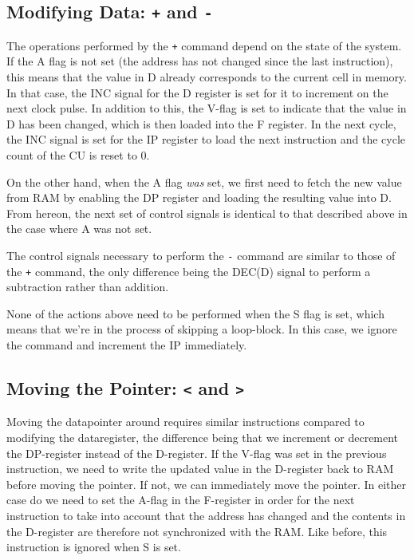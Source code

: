\subsection{Modifying Data: \texttt{+} and \texttt{-}}
The operations performed by the \texttt{+} command depend on the state of the system. If the A flag is not set (the address has not changed since the last instruction), this means that the value in D already corresponds to the current cell in memory. In that case, the INC signal for the D register is set for it to increment on the next clock pulse. In addition to this, the V-flag is set to indicate that the value in D has been changed, which is then loaded into the F register. In the next cycle, the INC signal is set for the IP register to load the next instruction and the cycle count of the CU is reset to 0.

On the other hand, when the A flag \emph{was} set, we first need to fetch the new value from RAM by enabling the DP register and loading the resulting value into D. From hereon, the next set of control signals is identical to that described above in the case where A was not set.

The control signals necessary to perform the \texttt{-} command are similar to those of the \texttt{+} command, the only difference being the DEC(D) signal to perform a subtraction rather than addition.

None of the actions above need to be performed when the S flag is set, which means that we're in the process of skipping a loop-block. In this case, we ignore the command and increment the IP immediately.

\subsection{Moving the Pointer: \texttt{<} and \texttt{>}}
Moving the datapointer around requires similar instructions compared to modifying the dataregister, the difference being that we increment or decrement the DP-register instead of the D-register. If the V-flag was set in the previous instruction, we need to write the updated value in the D-register back to RAM before moving the pointer. If not, we can immediately move the pointer. In either case do we need to set the A-flag in the F-register in order for the next instruction to take into account that the address has changed and the contents in the D-register are therefore not synchronized with the RAM. Like before, this instruction is ignored when S is set.

